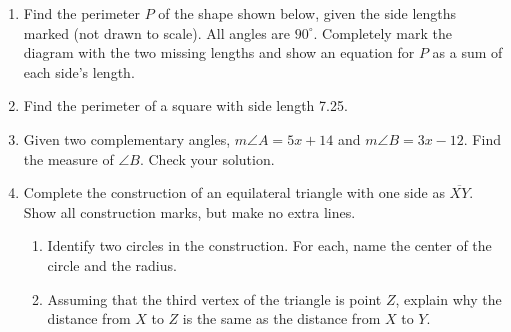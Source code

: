 \documentclass[12pt, twoside]{article}
\begin{document}
\begin{enumerate}
\item Find the perimeter $P$ of the shape shown below, given the side lengths marked (not drawn to scale). All angles are $90^\circ$. Completely mark the diagram with the two missing lengths and show an equation for $P$ as a sum of each side's length.
  \begin{flushleft}
  \end{flushleft} \vspace{2cm}

\item Find the perimeter of a square with side length 7.25. \vspace{3cm}

\item Given two complementary angles, $m\angle A = 5x+14$ and $m\angle B = 3x-12$. Find the measure of $\angle B$. Check your solution. \vspace{3.5cm} 
 
\newpage
\item Complete the construction of an equilateral triangle with one side as $\overline{XY}$. Show all construction marks, but make no extra lines. \vspace{3cm}
  \begin{center}
  \end{center} \vspace{3cm}
  \begin{enumerate}
    \item Identify two circles in the construction. For each, name the center of the circle and the radius.  \vspace{3cm}
    \item Assuming that the third vertex of the triangle is point $Z$, explain why the distance from $X$ to $Z$ is the same as the distance from $X$ to $Y$.
  \end{enumerate}


\end{enumerate}
\end{document}
